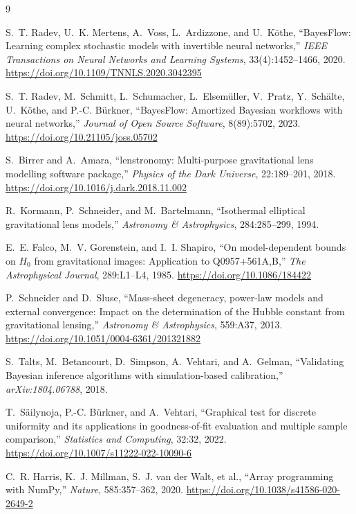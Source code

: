 \documentclass[11pt,a4paper]{article}
\begin{document}
\begin{thebibliography}{9}

S.~T. Radev, U.~K. Mertens, A.~Voss, L.~Ardizzone, and U.~K\"othe,
``BayesFlow: Learning complex stochastic models with invertible neural networks,''
\emph{IEEE Transactions on Neural Networks and Learning Systems}, 33(4):1452--1466,
2020. \url{https://doi.org/10.1109/TNNLS.2020.3042395}

S.~T. Radev, M.~Schmitt, L.~Schumacher, L.~Elsem\"uller, V.~Pratz, Y.~Sch\"alte,
U.~K\"othe, and P.-C. B\"urkner,
``BayesFlow: Amortized Bayesian workflows with neural networks,''
\emph{Journal of Open Source Software}, 8(89):5702, 2023.
\url{https://doi.org/10.21105/joss.05702}

S.~Birrer and A.~Amara,
``lenstronomy: Multi-purpose gravitational lens modelling software package,''
\emph{Physics of the Dark Universe}, 22:189--201, 2018.
\url{https://doi.org/10.1016/j.dark.2018.11.002}

R.~Kormann, P.~Schneider, and M.~Bartelmann,
``Isothermal elliptical gravitational lens models,''
\emph{Astronomy \& Astrophysics}, 284:285--299, 1994.

E.~E. Falco, M.~V. Gorenstein, and I.~I. Shapiro,
``On model-dependent bounds on $H_0$ from gravitational images: Application to
Q0957+561A,B,'' \emph{The Astrophysical Journal}, 289:L1--L4, 1985.
\url{https://doi.org/10.1086/184422}

P.~Schneider and D.~Sluse,
``Mass-sheet degeneracy, power-law models and external convergence: Impact on the
determination of the Hubble constant from gravitational lensing,''
\emph{Astronomy \& Astrophysics}, 559:A37, 2013.
\url{https://doi.org/10.1051/0004-6361/201321882}

S.~Talts, M.~Betancourt, D.~Simpson, A.~Vehtari, and A.~Gelman,
``Validating Bayesian inference algorithms with simulation-based calibration,''
\emph{arXiv:1804.06788}, 2018.

T.~S\"ailynoja, P.-C. B\"urkner, and A.~Vehtari,
``Graphical test for discrete uniformity and its applications in goodness-of-fit
evaluation and multiple sample comparison,''
\emph{Statistics and Computing}, 32:32, 2022.
\url{https://doi.org/10.1007/s11222-022-10090-6}

C.~R. Harris, K.~J. Millman, S.~J. van der Walt, et al.,
``Array programming with NumPy,'' \emph{Nature}, 585:357--362, 2020.
\url{https://doi.org/10.1038/s41586-020-2649-2}

\end{thebibliography}
\end{document}
